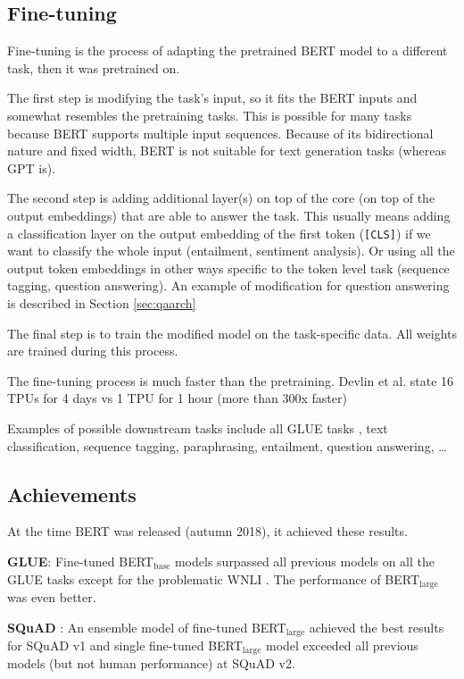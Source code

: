 \documentclass[
  printed, %
  color,   %
  table,   %
  oneside, %
  lof,     %
  lot,     %
]{fithesis3}
\begin{document}
\subsection{Fine-tuning}
Fine-tuning is the process of adapting the pretrained BERT model to a different task, then it was pretrained on. 

The first step is modifying the task's input, so it fits the BERT inputs and somewhat resembles the pretraining tasks. This is possible for many tasks because BERT supports multiple input sequences. Because of its bidirectional nature and fixed width, BERT is not suitable for text generation tasks (whereas GPT\parencite{gpt} is).

The second step is adding additional layer(s) on top of the core (on top of the output embeddings) that are able to answer the task. This usually means adding a classification layer on the output embedding of the first token (\texttt{[CLS]}) if we want to classify the whole input (entailment, sentiment analysis). Or using all the output token embeddings in other ways specific to the token level task (sequence tagging, question answering). An example of modification for question answering is described in Section \ref{sec:qaarch}

The final step is to train the modified model on the task-specific data. All weights are trained during this process.

The fine-tuning process is much faster than the pretraining.  Devlin et al. \parencite{bert} state 16 TPUs for 4 days vs 1 TPU for 1 hour (more than 300x faster)

Examples of possible downstream tasks include all GLUE tasks \parencite{glue}, text classification, sequence tagging, paraphrasing, entailment, question answering, \dots

\subsection{Achievements}
At the time BERT was released (autumn 2018), it achieved these results.

\textbf{GLUE}: Fine-tuned BERT$_\text{base}$ models surpassed all previous models on all the GLUE \parencite{glue} tasks except for the problematic WNLI \parencite[Table 1]{bert}. The performance of BERT$_\text{large}$ was even better.

\textbf{SQuAD} \parencite{squad}: An ensemble model of fine-tuned BERT$_\text{large}$ achieved the best results for SQuAD v1 \parencite[Table 2]{bert} and single fine-tuned BERT$_\text{large}$ model exceeded all previous models (but not human performance) at SQuAD v2\parencite[Table 3]{bert}. 
\end{document}

